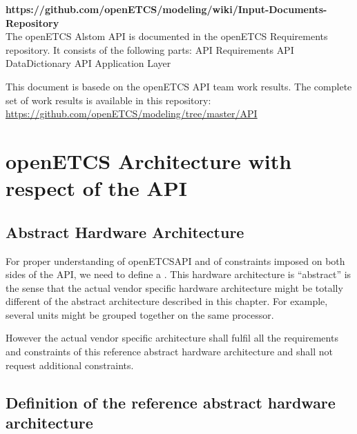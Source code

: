 \documentclass{template/openetcs_report}
\begin{document}
\textbf{https://github.com/openETCS/modeling/wiki/Input-Documents-Repository}\\

The openETCS Alstom API is documented in the openETCS Requirements repository. It consists of the following parts:
\cite{alstom-api} API Requirements
\cite{alstom-api-data-dict} API DataDictionary
\cite{alstom-api-app-layer} API Application Layer

This document is basede on the openETCS API team work results. The complete set of work results is available in this repository: \url{https://github.com/openETCS/modeling/tree/master/API}

\chapter{openETCS Architecture with respect of the API}

\section{Abstract Hardware Architecture}

For proper understanding of openETCSAPI and of constraints imposed on
both sides of the API, we need to define a . This hardware architecture is ``abstract''
is the sense that the actual vendor specific hardware architecture
might be totally different of the abstract architecture described in
this chapter. For example, several units might be grouped together on
the same processor.

However the actual vendor specific architecture shall fulfil all the
requirements and constraints of this reference abstract hardware
architecture and shall not request additional constraints.

\section{Definition of the reference abstract hardware architecture}
\end{document}
